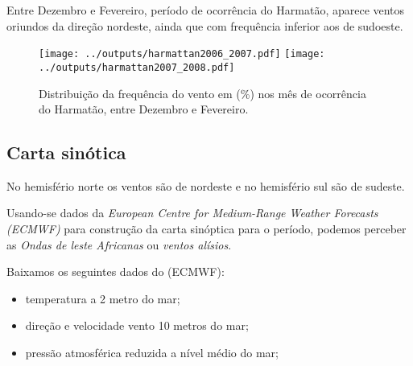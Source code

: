 Entre Dezembro e Fevereiro, período de ocorrência do Harmatão, aparece 
ventos oriundos da direção nordeste, ainda que com frequência inferior 
aos de sudoeste.

\begin{figure}[H]
\begin{center}
  \texttt{[image: ../outputs/harmattan2006\_2007.pdf]}
  \texttt{[image: ../outputs/harmattan2007\_2008.pdf]}
\end{center}
\caption{Distribuição da frequência do vento em (\%) nos mês de ocorrência
         do Harmatão, entre Dezembro e Fevereiro.}
\end{figure}

\subsection{Carta sinótica}


No hemisfério norte os ventos são de nordeste e no hemisfério sul são de sudeste. 


Usando-se dados da \textit{European Centre for Medium-Range Weather Forecasts (ECMWF)}
para construção da carta sinóptica para o período, podemos perceber as 
\textit{Ondas de leste Africanas} ou \textit{ventos alísios}.

Baixamos os seguintes dados do (ECMWF):
\begin{itemize}
  \item temperatura a 2 metro do mar;
  \item direção e velocidade vento 10 metros do mar;
  \item pressão atmosférica reduzida a nível médio do mar;
\end{itemize}



